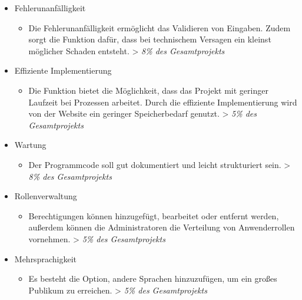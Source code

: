 \begin{itemize}
\itemsep1pt\parskip0pt
\item
  Fehlerunanfälligkeit

  \begin{itemize}
  \itemsep1pt\parskip0pt
  \item
    Die Fehlerunanfälligkeit ermöglicht das Validieren von Eingaben. Zudem sorgt die Funktion dafür, dass bei technischem Versagen ein
    kleinst möglicher Schaden entsteht. \textgreater{} \emph{8\%
    des Gesamtprojekts}
  \end{itemize}
\item
  Effiziente Implementierung

  \begin{itemize}
  \itemsep1pt\parskip0pt
  \item
    Die Funktion bietet die Möglichkeit, dass das Projekt mit geringer Laufzeit bei
    Prozessen arbeitet. Durch die effiziente Implementierung wird von der Website ein geringer Speicherbedarf genutzt. 
    \textgreater{} \emph{5\% des Gesamtprojekts}
  \end{itemize}
\item
  Wartung

  \begin{itemize}
  \itemsep1pt\parskip0pt
  \item
    Der Programmcode soll gut dokumentiert und leicht strukturiert sein.
    \textgreater{} \emph{8\% des Gesamtprojekts}
  \end{itemize}
\item
  Rollenverwaltung

  \begin{itemize}
  \itemsep1pt\parskip0pt
  \item
    Berechtigungen können hinzugefügt, bearbeitet oder entfernt werden,
    außerdem können die Administratoren die Verteilung von Anwenderrollen vornehmen. \textgreater{} \emph{5\%
    des Gesamtprojekts}
  \end{itemize}
\item
  Mehrsprachigkeit

  \begin{itemize}
  \itemsep1pt\parskip0pt
  \item
    Es besteht die Option, andere Sprachen hinzuzufügen, um ein großes Publikum zu
    erreichen. \textgreater{} \emph{5\% des Gesamtprojekts}
  \end{itemize}
\end{itemize}
